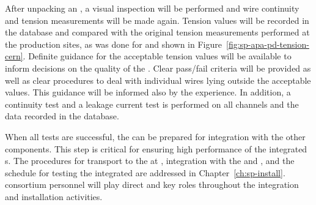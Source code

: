 After unpacking an ,  a visual inspection will be performed and wire continuity and tension measurements will be made again. 
Tension values will be recorded in the database and compared with the original tension measurements performed at the production sites, as was done for  and shown in Figure~\ref{fig:sp-apa-pd-tension-cern}. Definite guidance for the acceptable tension values will be available to inform decisions on the quality of the . Clear pass/fail criteria %
will be provided as well as clear procedures to deal with individual wires lying outside the acceptable values. %
This guidance will be informed also by the  experience. %
In addition, a continuity test and a leakage current test is performed on all channels and the data recorded in the database. 


When all tests are successful, 
the  can be prepared 
for integration with the other components. %
This step is critical for ensuring high performance of the integrated s. The procedures for  transport to the  at , integration with the  and , and the schedule for testing the integrated  are addressed in %
Chapter~\ref{ch:sp-install}.  consortium personnel will play direct and key roles throughout the integration and installation activities.  



